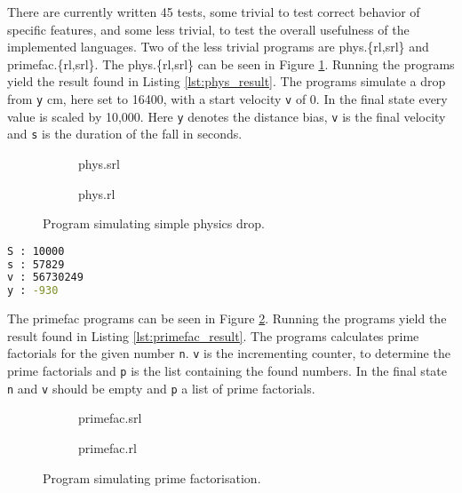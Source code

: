 %
\noindent
There are currently written 45 tests, some trivial to test correct behavior of specific features, and some less trivial, to test the overall usefulness of the implemented languages.
Two of the less trivial programs are phys.\{rl,srl\} and primefac.\{rl,srl\}.
The phys.\{rl,srl\} can be seen in Figure \ref{fig:phys_files}.
Running the programs yield the result found in Listing \ref{lst:phys_result}.
The programs simulate a drop from \texttt{y} cm, here set to 16400, with a start velocity \texttt{v} of 0.
In the final state every value is scaled by 10,000.
Here \texttt{y} denotes the distance bias, \texttt{v} is the final velocity and \texttt{s} is the duration of the fall in seconds.

\begin{figure}[H]
  \center
  \begin{subfigure}[b]{0.4\textwidth}
    
    \caption{phys.srl}
  \end{subfigure}\qquad%
  \begin{subfigure}[b]{0.4\textwidth}
    
    \caption{phys.rl}
  \end{subfigure}
  \caption{Program simulating simple physics drop.}
  \label{fig:phys_files}
\end{figure}

\begin{lstlisting}[language=sh,caption={Result for phys.srl},label={lst:phys_result}]
S : 10000
s : 57829
v : 56730249
y : -930
\end{lstlisting}

The primefac programs can be seen in Figure \ref{fig:primefac_files}.
Running the programs yield the result found in Listing \ref{lst:primefac_result}.
The programs calculates prime factorials for the given number \texttt{n}.
\texttt{v} is the incrementing counter, to determine the prime factorials and \texttt{p} is the list containing the found numbers.
In the final state \texttt{n} and \texttt{v} should be empty and \texttt{p} a list of prime factorials.\\

\begin{figure}[H]
  \center
  \begin{subfigure}[b]{0.4\textwidth}
    
    \caption{primefac.srl}
  \end{subfigure}\qquad%
  \begin{subfigure}[b]{0.4\textwidth}
    
    \caption{primefac.rl}
  \end{subfigure}
  \caption{Program simulating prime factorisation.}
  \label{fig:primefac_files}
\end{figure}

